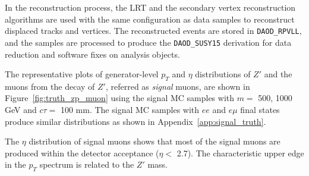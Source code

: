 In the reconstruction process, the LRT and the secondary vertex reconstruction algorithms are used with the same configuration as data samples to reconstruct displaced tracks and vertices. The reconstructed events are stored in \texttt{DAOD\_RPVLL}, and the samples are processed to produce the \texttt{DAOD\_SUSY15} derivation for data reduction and software fixes on analysis objects.

The representative plots of generator-level $p_{T}$ and $\eta$ distributions of $Z'$ and the muons from the decay of $Z'$, referred as \textit{signal} muons, are shown in Figure~\ref{fig:truth_zp_muon} using the signal MC samples with $m=$ 500, 1000 GeV and $c\tau=$ 100 mm. The signal MC samples with $ee$ and $e\mu$ final states produce similar distributions as shown in Appendix~\ref{app:signal_truth}.

The $\eta$ distribution of signal muons shows that most of the signal muons are produced within the detector acceptance ($\eta <$ 2.7). The characteristic upper edge in the $p_{T}$ spectrum is related to the $Z'$ mass.


